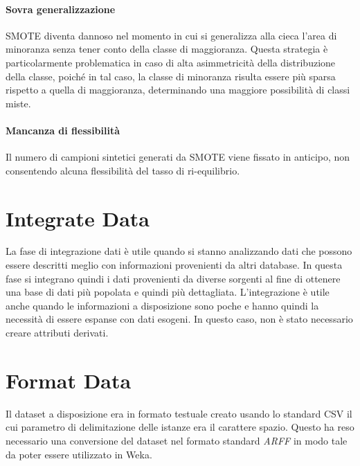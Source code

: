\paragraph{Sovra generalizzazione}
SMOTE diventa dannoso nel momento in cui si generalizza alla cieca l'area di minoranza senza tener conto della classe di maggioranza. Questa strategia è particolarmente problematica in caso di alta asimmetricità della distribuzione della classe, poiché in tal caso, la classe di minoranza risulta essere più sparsa rispetto a quella di maggioranza, determinando una maggiore possibilità di classi miste.

\paragraph{Mancanza di flessibilità}
Il numero di campioni sintetici generati da SMOTE viene fissato in anticipo, non consentendo alcuna flessibilità del tasso di ri-equilibrio.

\section{Integrate Data}
La fase di integrazione dati è utile quando si stanno analizzando dati che possono essere descritti meglio con informazioni provenienti da altri database. In questa fase si integrano quindi i dati provenienti da diverse sorgenti al fine di ottenere una base di dati più popolata e quindi più dettagliata. L'integrazione è utile anche quando le informazioni a disposizione sono poche e hanno quindi la necessità di essere espanse con dati esogeni.
In questo caso, non è stato necessario creare attributi derivati.

\section{Format Data}
Il dataset a disposizione era in formato testuale creato usando lo standard CSV il cui parametro di delimitazione delle istanze era il carattere spazio. Questo ha reso necessario una conversione del dataset nel formato standard \emph{ARFF} in modo tale da poter essere utilizzato in Weka.
